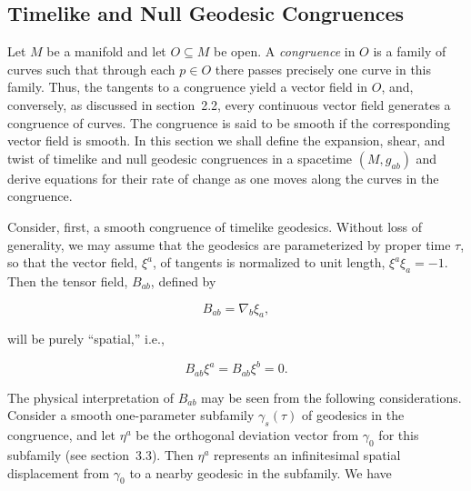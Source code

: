 
\subsection{Timelike and Null Geodesic Congruences}\label{sec:9.2}

\setcounter{theorem}{0}

Let \(M\) be a manifold and let \(O\subseteq M\) be open. A \emph{congruence} in \(O\) is a
family of curves such that through each \(p\in O\) there passes precisely one curve in
this family. Thus, the tangents to a congruence yield a vector field in \(O\), and,
conversely, as discussed in section~2.2, every continuous vector field generates a
congruence of curves. The congruence is said to be smooth if the corresponding vector
field is smooth. In this section we shall define the expansion, shear, and twist of
timelike and null geodesic congruences in a spacetime \((M,g_{ab})\) and derive
equations for their rate of change as one moves along the curves in the congruence.

Consider, first, a smooth congruence of timelike geodesics. Without loss of
generality, we may assume that the geodesics are parameterized by proper time
\(\tau\), so that the vector field, \(\xi^a\), of tangents is normalized to unit length,
\(\xi^a\xi_a=-1\). Then the tensor field, \(B_{ab}\), defined by

\begin{equation}
  B_{ab}=\nabla_b\xi_a ,
  \tag{9.2.1}\label{eq:9.2.1}
\end{equation}

will be purely ``spatial,'' i.e.,

\begin{equation}
  B_{ab}\xi^a=B_{ab}\xi^b=0 .
  \tag{9.2.2}\label{eq:9.2.2}
\end{equation}

The physical interpretation of \(B_{ab}\) may be seen from the following considerations.
Consider a smooth one-parameter subfamily \(\gamma_s(\tau)\) of geodesics in the
congruence, and let \(\eta^a\) be the orthogonal deviation vector from \(\gamma_0\) for
this subfamily (see section~3.3). Then \(\eta^a\) represents an infinitesimal spatial
displacement from \(\gamma_0\) to a nearby geodesic in the subfamily. We have

